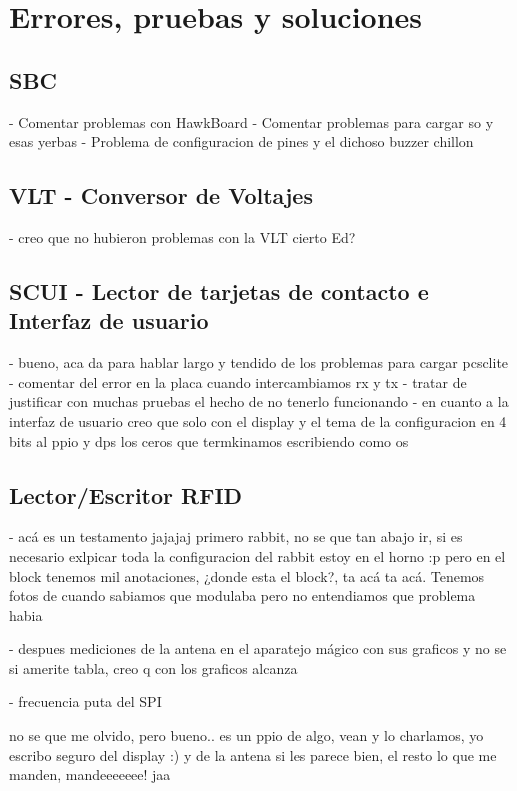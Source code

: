 \chapter{Errores, pruebas y soluciones}

\section{SBC}
- Comentar problemas con HawkBoard
- Comentar problemas para cargar so y esas yerbas
- Problema de configuracion de pines y el dichoso buzzer chillon

\section{VLT - Conversor de Voltajes}
- creo que no hubieron problemas con la VLT cierto Ed?

\section{SCUI - Lector de tarjetas de contacto e Interfaz de usuario}
- bueno, aca da para hablar largo y tendido de los problemas para cargar pcsclite
- comentar del error en la placa cuando intercambiamos rx y tx
- tratar de justificar con muchas pruebas el hecho de no tenerlo funcionando
- en cuanto a la interfaz de usuario creo que solo con el display y el tema de la configuracion en 4 bits al ppio y dps los ceros que termkinamos escribiendo como os

\section{Lector/Escritor RFID}
- acá es un testamento jajajaj primero rabbit, no se que tan abajo ir, si es necesario exlpicar toda la configuracion del rabbit estoy en el horno :p pero en el block tenemos mil anotaciones, ¿donde esta el block?, ta acá ta acá. Tenemos fotos de cuando sabiamos que modulaba pero no entendiamos que problema habia

- despues mediciones de la antena en el aparatejo mágico con sus graficos y no se si amerite tabla, creo q con los graficos alcanza

- frecuencia puta del SPI

no se que me olvido, pero bueno.. es un ppio de algo, vean y lo charlamos, yo escribo seguro del display :) y de la antena si les parece bien, el resto lo que me manden, mandeeeeeee! jaa